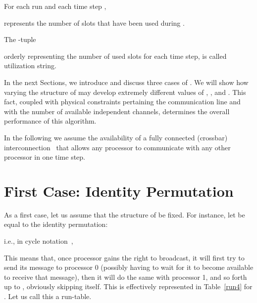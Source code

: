 \documentclass{elsart}
\begin{document}
\begin{defn}
\label{nut}
For each run and each time step ,

represents the number of slots that have been used during .
\end{defn}

\begin{defn}
\label{us}
The -tuple

orderly representing the number of used slots for
each time step, is called utilization string.
\end{defn}

In the next Sections, we introduce and discuss three cases
of . We will show how varying the structure of 
may develop extremely different values of , , and .
This fact, coupled with physical constraints pertaining the communication line
and with the number of available independent channels,
determines the overall performance of this algorithm.

In the following we assume the availability of
a fully connected (crossbar) interconnection~\cite{PaHe96}
that allows any processor to communicate with any other processor
in one time step.

\section{First Case: Identity Permutation}\label{zerocase}
As a first case, let us assume that the structure of  
be fixed. For instance,
let  be equal to the identity permutation:

i.e., in cycle notation~\cite{Knu73a},



This means that, once processor  gains the right to broadcast,
it will first try to send its message to processor 0 
(possibly having to wait for it to become available to receive that message),
then it will do the same with processor 1, and so
forth up to , obviously skipping itself. This is effectively
represented in Table~\ref{run4} for . Let us call this a run-table.
\end{document}
